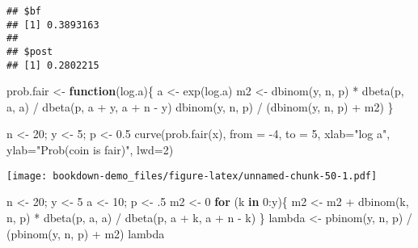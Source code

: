 \documentclass[
]{book}
\newenvironment{Shaded}{\begin{snugshade}}{\end{snugshade}}
\newcommand{\AttributeTok}[1]{\textcolor[rgb]{0.77,0.63,0.00}{#1}}
\newcommand{\ControlFlowTok}[1]{\textcolor[rgb]{0.13,0.29,0.53}{\textbf{#1}}}
\newcommand{\DecValTok}[1]{\textcolor[rgb]{0.00,0.00,0.81}{#1}}
\newcommand{\FloatTok}[1]{\textcolor[rgb]{0.00,0.00,0.81}{#1}}
\newcommand{\FunctionTok}[1]{\textcolor[rgb]{0.00,0.00,0.00}{#1}}
\newcommand{\NormalTok}[1]{#1}
\newcommand{\OtherTok}[1]{\textcolor[rgb]{0.56,0.35,0.01}{#1}}
\newcommand{\SpecialCharTok}[1]{\textcolor[rgb]{0.00,0.00,0.00}{#1}}
\newcommand{\StringTok}[1]{\textcolor[rgb]{0.31,0.60,0.02}{#1}}
\begin{document}
\begin{verbatim}
## $bf
## [1] 0.3893163
## 
## $post
## [1] 0.2802215
\end{verbatim}

\begin{Shaded}
\begin{Highlighting}[]
\NormalTok{prob.fair }\OtherTok{\textless{}{-}} \ControlFlowTok{function}\NormalTok{(log.a)\{}
\NormalTok{  a }\OtherTok{\textless{}{-}} \FunctionTok{exp}\NormalTok{(log.a)}
\NormalTok{  m2 }\OtherTok{\textless{}{-}} \FunctionTok{dbinom}\NormalTok{(y, n, p) }\SpecialCharTok{*} \FunctionTok{dbeta}\NormalTok{(p, a, a) }\SpecialCharTok{/}
             \FunctionTok{dbeta}\NormalTok{(p, a }\SpecialCharTok{+}\NormalTok{ y, a }\SpecialCharTok{+}\NormalTok{ n }\SpecialCharTok{{-}}\NormalTok{ y)}
  \FunctionTok{dbinom}\NormalTok{(y, n, p) }\SpecialCharTok{/}\NormalTok{ (}\FunctionTok{dbinom}\NormalTok{(y, n, p) }\SpecialCharTok{+}\NormalTok{ m2)}
\NormalTok{\}}
\end{Highlighting}
\end{Shaded}

\begin{Shaded}
\begin{Highlighting}[]
\NormalTok{n }\OtherTok{\textless{}{-}} \DecValTok{20}\NormalTok{; y }\OtherTok{\textless{}{-}} \DecValTok{5}\NormalTok{; p }\OtherTok{\textless{}{-}} \FloatTok{0.5}
\FunctionTok{curve}\NormalTok{(}\FunctionTok{prob.fair}\NormalTok{(x), }\AttributeTok{from =} \SpecialCharTok{{-}}\DecValTok{4}\NormalTok{, }\AttributeTok{to =} \DecValTok{5}\NormalTok{, }
      \AttributeTok{xlab=}\StringTok{"log a"}\NormalTok{, }
      \AttributeTok{ylab=}\StringTok{"Prob(coin is fair)"}\NormalTok{, }\AttributeTok{lwd=}\DecValTok{2}\NormalTok{)}
\end{Highlighting}
\end{Shaded}

\texttt{[image: bookdown-demo\_files/figure-latex/unnamed-chunk-50-1.pdf]}

\begin{Shaded}
\begin{Highlighting}[]
\NormalTok{n }\OtherTok{\textless{}{-}} \DecValTok{20}\NormalTok{; y }\OtherTok{\textless{}{-}} \DecValTok{5}
\NormalTok{a }\OtherTok{\textless{}{-}} \DecValTok{10}\NormalTok{; p }\OtherTok{\textless{}{-}}\NormalTok{ .}\DecValTok{5}
\NormalTok{m2 }\OtherTok{\textless{}{-}} \DecValTok{0}
 \ControlFlowTok{for}\NormalTok{ (k }\ControlFlowTok{in} \DecValTok{0}\SpecialCharTok{:}\NormalTok{y)\{}
\NormalTok{   m2 }\OtherTok{\textless{}{-}}\NormalTok{ m2 }\SpecialCharTok{+} \FunctionTok{dbinom}\NormalTok{(k, n, p) }\SpecialCharTok{*} \FunctionTok{dbeta}\NormalTok{(p, a, a) }\SpecialCharTok{/}
     \FunctionTok{dbeta}\NormalTok{(p, a }\SpecialCharTok{+}\NormalTok{ k, a }\SpecialCharTok{+}\NormalTok{ n }\SpecialCharTok{{-}}\NormalTok{ k)}
\NormalTok{\}}
\NormalTok{lambda }\OtherTok{\textless{}{-}} \FunctionTok{pbinom}\NormalTok{(y, n, p) }\SpecialCharTok{/}\NormalTok{ (}\FunctionTok{pbinom}\NormalTok{(y, n, p) }\SpecialCharTok{+}\NormalTok{ m2)}
\NormalTok{lambda}
\end{Highlighting}
\end{Shaded}
\end{document}
